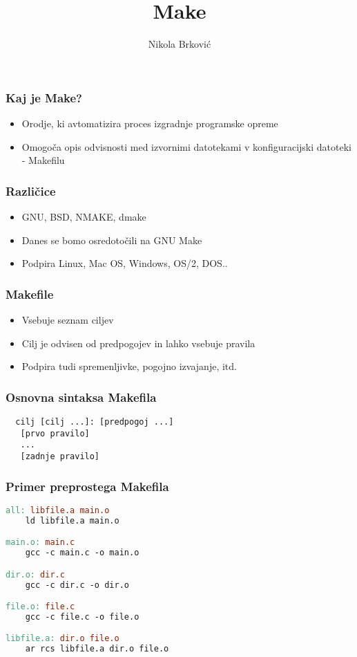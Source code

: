 \documentclass{beamer}
\title{Make}
\author{Nikola Brković}
\begin{document}
\frame{\titlepage}

\begin{frame}
  \frametitle{Kaj je Make?}

  \begin{itemize}
  \item Orodje, ki avtomatizira proces izgradnje programske opreme
  \item Omogoča opis odvisnosti med izvornimi datotekami v
    konfiguracijski datoteki - Makefilu
  \end{itemize}
\end{frame}

\begin{frame}
  \frametitle{Različice}
  
  \begin{itemize}
  \item GNU, BSD, NMAKE, dmake
  \item Danes se bomo osredotočili na GNU Make
  \item Podpira Linux, Mac OS, Windows, OS/2, DOS..
  \end{itemize}
\end{frame}  

\begin{frame}
  \frametitle{Makefile}

  \begin{itemize}
  \item Vsebuje seznam ciljev
  \item Cilj je odvisen od predpogojev in lahko vsebuje pravila 
  \item Podpira tudi spremenljivke, pogojno izvajanje, itd.
  \end{itemize}
\end{frame}

\begin{frame}[fragile]
  \frametitle{Osnovna sintaksa Makefila}
  
\begin{verbatim}
  cilj [cilj ...]: [predpogoj ...]
   [prvo pravilo]
   ...
   [zadnje pravilo]
\end{verbatim}
\end{frame}

\begin{frame}[t, fragile]
  \frametitle{Primer preprostega Makefila}

\begin{lstlisting}[language=make, frame=single]
all: libfile.a main.o
	ld libfile.a main.o

main.o: main.c
	gcc -c main.c -o main.o

dir.o: dir.c
	gcc -c dir.c -o dir.o

file.o: file.c
	gcc -c file.c -o file.o

libfile.a: dir.o file.o
	ar rcs libfile.a dir.o file.o
\end{lstlisting}
\end{frame}
\end{document}
